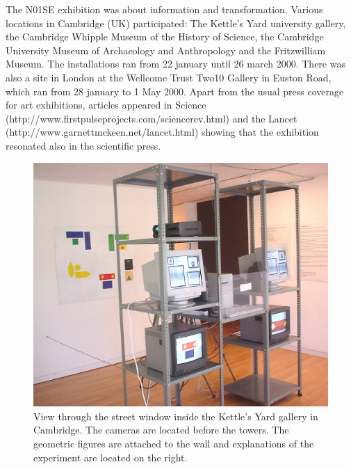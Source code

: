 The N01SE exhibition was about information and transformation. 
Various locations in Cambridge (UK) participated: The Kettle's Yard university gallery, 
the Cambridge Whipple Museum of the History of Science, the Cambridge University Museum of 
Archaeology and Anthropology and the 
Fritzwilliam Museum. The installations ran from 22 january until 26 march 2000. There was also a site 
in London at the Wellcome Trust Two10 Gallery in Euston Road, which 
ran from 28 january to 1 May 2000. Apart from the usual press coverage for art exhibitions, articles appeared in
Science (http://www.firstpulseprojects.com/sciencerev.html) and the Lancet \\ (http://www.garnettmckeen.net/lancet.html) 
showing that the exhibition resonated also in the scientific press. 

\begin{figure}[htbp]
  \centerline{\includegraphics[width=.75\textwidth]{chap9/figs/cambridge-view}}
\caption{\label{fig:sideview} 
View through the street window inside the Kettle's Yard gallery in Cambridge. The cameras are located before 
the towers. The geometric figures are attached to the wall and explanations of the experiment are located on the right.}
\end{figure}

